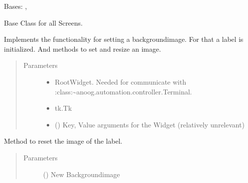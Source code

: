 \documentclass[letterpaper,10pt,english]{sphinxmanual}
\begin{document}
\begin{fulllineitems}
\label{\detokenize{anoog.automation:anoog.automation.graphical_user_interface.Screen}}
\sphinxAtStartPar
Bases: , 

\sphinxAtStartPar
Base Class for all Screens.

\sphinxAtStartPar
Implements the functionality for setting a background\sphinxhyphen{}image.
For that a label is initialized. And methods to set and resize an image.
\begin{quote}\begin{description}
\item[{Parameters}] \leavevmode\begin{itemize}
\item {} 
\sphinxAtStartPar
{} \textendash{} Root\sphinxhyphen{}Widget. Needed for communicate with :class:\textasciitilde{}anoog.automation.controller.Terminal.

\item {} 
\sphinxAtStartPar
{} \textendash{} tk.Tk

\item {} 
\sphinxAtStartPar
{} () \textendash{} Key, Value arguments for the Widget (relatively unrelevant)

\end{itemize}

\end{description}\end{quote}

\begin{fulllineitems}
\label{\detokenize{anoog.automation:anoog.automation.graphical_user_interface.Screen.resize_bg}}
\sphinxAtStartPar
Method to reset the image of the label.
\begin{quote}\begin{description}
\item[{Parameters}] \leavevmode
\sphinxAtStartPar
{} () \textendash{} New Backgroundimage


\end{description}
\end{quote}
\end{fulllineitems}
\end{fulllineitems}
\end{document}
